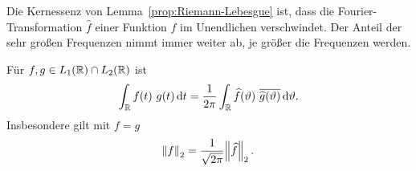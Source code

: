 \begin{remark}
Die Kernessenz von Lemma~\ref{prop:Riemann-Lebesgue} ist, dass die Fourier-Transformation 
$ \widehat{f} $ einer Funktion $ f $ im Unendlichen verschwindet. Der Anteil der sehr großen
Frequenzen nimmt immer weiter ab, je größer die Frequenzen werden.
\end{remark}

\begin{proposition}
Für $ f, g \in L_{1}(\mathbb{R}) \cap L_{2}(\mathbb{R}) $ ist
\[
    \int_{\R} f(t) \ g(t) \dif t 
  = \frac{1}{2\pi} \int_{\R} \widehat{f}(\vartheta) \ \overline{\widehat{g}(\vartheta)}
      \dif \vartheta.
\]
Insbesondere gilt mit $ f = g $
\[
  \norm{f}_{2} = \frac{1}{\sqrt{2\pi}} \norm{\widehat{f}}_{2}.
\]
\end{proposition}

